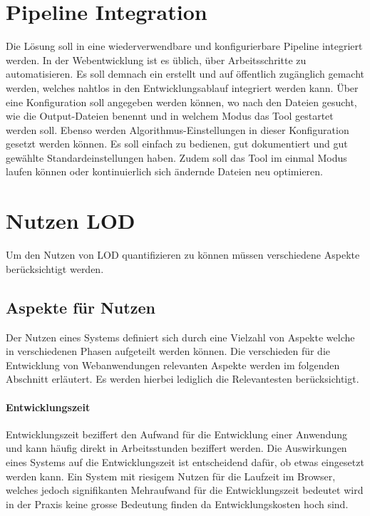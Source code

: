 \section{Pipeline Integration}
Die Lösung soll in eine wiederverwendbare und konfigurierbare Pipeline integriert werden.
In der Webentwicklung ist es üblich, über  Arbeitsschritte zu automatisieren. Es soll demnach ein  erstellt und auf  öffentlich zugänglich gemacht werden, welches nahtlos in den Entwicklungsablauf integriert werden kann. Über eine Konfiguration soll angegeben werden können, wo nach den  Dateien gesucht, wie die Output-Dateien benennt und in welchem Modus das Tool gestartet werden soll. Ebenso werden Algorithmus-Einstellungen in dieser Konfiguration gesetzt werden können. Es soll einfach zu bedienen, gut dokumentiert und gut gewählte Standardeinstellungen haben. Zudem soll das Tool im einmal Modus laufen können oder kontinuierlich sich ändernde Dateien neu optimieren.

\section{Nutzen LOD}
Um den Nutzen von LOD quantifizieren zu können müssen verschiedene Aspekte berücksichtigt werden.

\subsection{Aspekte für Nutzen}

Der Nutzen eines Systems definiert sich durch eine Vielzahl von Aspekte welche in verschiedenen Phasen aufgeteilt werden können. Die verschieden für die Entwicklung von Webanwendungen relevanten Aspekte werden im folgenden Abschnitt erläutert. Es werden hierbei lediglich die Relevantesten berücksichtigt.

\paragraph{Entwicklungszeit}

Entwicklungszeit beziffert den Aufwand für die Entwicklung einer Anwendung und kann häufig direkt in Arbeitsstunden beziffert werden.
Die Auswirkungen eines Systems auf die Entwicklungszeit ist entscheidend dafür, ob etwas eingesetzt werden kann. Ein System mit riesigem Nutzen für die Laufzeit im Browser, welches jedoch signifikanten Mehraufwand für die Entwicklungszeit bedeutet wird in der Praxis keine grosse Bedeutung finden da Entwicklungskosten hoch sind.

